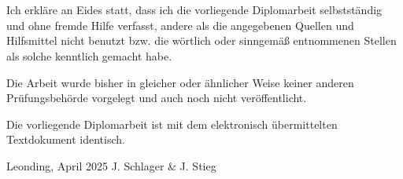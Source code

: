 \thispagestyle{empty}
\vspace{3cm}
~ \\ \\
Ich erkläre an Eides statt, dass ich die vorliegende Diplomarbeit selbstständig und ohne fremde Hilfe verfasst, andere als die angegebenen Quellen und Hilfsmittel nicht benutzt bzw. die wörtlich oder sinngemäß entnommenen Stellen als solche kenntlich gemacht habe.

Die Arbeit wurde bisher in gleicher oder ähnlicher Weise keiner anderen Prüfungsbehörde vorgelegt und auch noch nicht veröffentlicht.

Die vorliegende Diplomarbeit ist mit dem elektronisch übermittelten Textdokument identisch.
\vspace{3cm}
\begin{tabbing}
Leonding, April 2025 \hspace{5cm} J. Schlager \& J. Stieg
\end{tabbing}
\vspace{10cm}
\newpage
\setcounter{page}{1}
